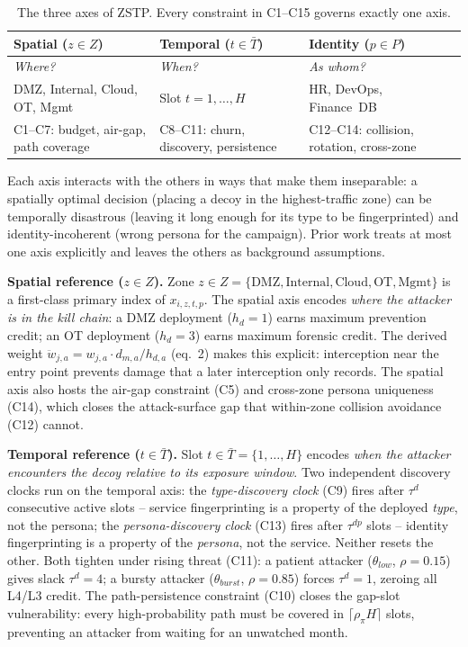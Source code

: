 \documentclass[10pt,twocolumn]{article}
\begin{document}
\begin{table}[h]
\centering
\caption{The three axes of ZSTP. Every constraint in C1--C15 governs exactly one axis.}
\label{tab:sti}
\small
\setlength{\tabcolsep}{4pt}
\begin{tabular}{@{}p{2.2cm}p{2.3cm}p{2.8cm}@{}}
\toprule
\textbf{Spatial} ($z\in Z$) & \textbf{Temporal} ($t\in\bar{T}$) & \textbf{Identity} ($p\in P$) \\
\midrule
\emph{Where?} & \emph{When?} & \emph{As whom?} \\[2pt]
DMZ, Internal, Cloud, OT, Mgmt & Slot $t{=}1,\ldots,H$ & HR, DevOps, Finance~DB \\[2pt]
C1--C7: budget, air-gap, path coverage & C8--C11: churn, discovery, persistence & C12--C14: collision, rotation, cross-zone \\
\bottomrule
\end{tabular}
\end{table}

\noindent Each axis interacts with the others in ways that make them inseparable: a spatially optimal decision (placing a decoy in the highest-traffic zone) can be temporally disastrous (leaving it long enough for its type to be fingerprinted) and identity-incoherent (wrong persona for the campaign). Prior work treats at most one axis explicitly and leaves the others as background assumptions.

\medskip\noindent\textbf{Spatial reference ($z\in Z$).}\enspace
Zone $z\in Z{=}\{\text{DMZ},\text{Internal},\text{Cloud},\text{OT},\text{Mgmt}\}$ is a first-class primary index of $x_{i,z,t,p}$. The spatial axis encodes \emph{where the attacker is in the kill chain}: a DMZ deployment ($h_d{=}1$) earns maximum prevention credit; an OT deployment ($h_d{=}3$) earns maximum forensic credit. The derived weight $\ddot{w}_{j,a}=w_{j,a}\cdot d_{m,a}/h_{d,a}$ (eq.~2) makes this explicit: interception near the entry point prevents damage that a later interception only records. The spatial axis also hosts the air-gap constraint (C5) and cross-zone persona uniqueness (C14), which closes the attack-surface gap that within-zone collision avoidance (C12) cannot.

\medskip\noindent\textbf{Temporal reference ($t\in\bar{T}$).}\enspace
Slot $t\in\bar{T}{=}\{1,\ldots,H\}$ encodes \emph{when the attacker encounters the decoy relative to its exposure window}. Two independent discovery clocks run on the temporal axis: the \emph{type-discovery clock} (C9) fires after $\tau^d$ consecutive active slots -- service fingerprinting is a property of the deployed \emph{type}, not the persona; the \emph{persona-discovery clock} (C13) fires after $\tau^{dp}$ slots -- identity fingerprinting is a property of the \emph{persona}, not the service. Neither resets the other. Both tighten under rising threat (C11): a patient attacker ($\theta_{low}$, $\rho{=}0.15$) gives slack $\tau^d{=}4$; a bursty attacker ($\theta_{burst}$, $\rho{=}0.85$) forces $\tau^d{=}1$, zeroing all L4/L3 credit. The path-persistence constraint (C10) closes the gap-slot vulnerability: every high-probability path must be covered in $\lceil\rho_\pi H\rceil$ slots, preventing an attacker from waiting for an unwatched month.
\end{document}
